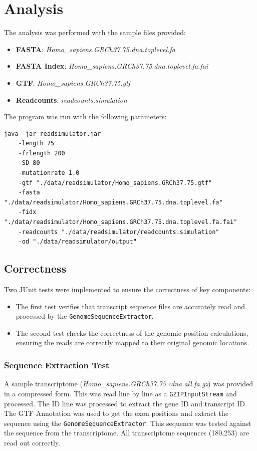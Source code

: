 \documentclass{article}
\begin{document}
    \section{Analysis}
    The analysis was performed with the sample files provided:
    \begin{itemize}
        \item \textbf{FASTA}: \textit{Homo\_sapiens.GRCh37.75.dna.toplevel.fa}
        \item \textbf{FASTA Index}: \textit{Homo\_sapiens.GRCh37.75.dna.toplevel.fa.fai}
        \item \textbf{GTF}: \textit{Homo\_sapiens.GRCh37.75.gtf}
        \item \textbf{Readcounts}: \textit{readcounts.simulation}

    \end{itemize}
    The program was run with the following parameters:
    \begin{verbatim}
java -jar readsimulator.jar
    -length 75
    -frlength 200
    -SD 80
    -mutationrate 1.0
    -gtf "./data/readsimulator/Homo_sapiens.GRCh37.75.gtf"
    -fasta "./data/readsimulator/Homo_sapiens.GRCh37.75.dna.toplevel.fa"
    -fidx "./data/readsimulator/Homo_sapiens.GRCh37.75.dna.toplevel.fa.fai"
    -readcounts "./data/readsimulator/readcounts.simulation"
    -od "./data/readsimulator/output"
    \end{verbatim}


    \subsection{Correctness}
    Two JUnit tests were implemented to ensure the correctness of key components:
    \begin{itemize}
        \item The first test verifies that transcript sequence files are accurately read and processed by the \texttt{GenomeSequenceExtractor}.
        \item The second test checks the correctness of the genomic position calculations, ensuring the reads are correctly mapped to their original genomic locations.
    \end{itemize}

    \subsubsection{Sequence Extraction Test}
    A sample transcriptome (\textit{Homo\_sapiens.GRCh37.75.cdna.all.fa.gz}) was provided in a compressed form. This was read line by line as a \texttt{GZIPInputStream} and processed. The ID line was processed to extract the gene ID and transcript ID. The GTF Annotation was used to get the exon positions and extract the sequence using the \texttt{GenomeSequenceExtractor}. This sequence was tested against the sequence from the transcriptome. All transcriptome sequences (180,253) are read out correctly.
\end{document}
